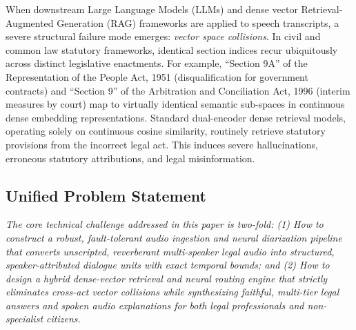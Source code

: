 \documentclass{llncs}
\begin{document}
When downstream Large Language Models (LLMs) and dense vector Retrieval-Augmented Generation (RAG) frameworks are applied to speech transcripts, a severe structural failure mode emerges: \textit{vector space collisions}. In civil and common law statutory frameworks, identical section indices recur ubiquitously across distinct legislative enactments. For example, ``Section 9A'' of the Representation of the People Act, 1951 (disqualification for government contracts) and ``Section 9'' of the Arbitration and Conciliation Act, 1996 (interim measures by court) map to virtually identical semantic sub-spaces in continuous dense embedding representations. Standard dual-encoder dense retrieval models, operating solely on continuous cosine similarity, routinely retrieve statutory provisions from the incorrect legal act. This induces severe hallucinations, erroneous statutory attributions, and legal misinformation.

\subsection{Unified Problem Statement}
\textit{The core technical challenge addressed in this paper is two-fold: (1) How to construct a robust, fault-tolerant audio ingestion and neural diarization pipeline that converts unscripted, reverberant multi-speaker legal audio into structured, speaker-attributed dialogue units with exact temporal bounds; and (2) How to design a hybrid dense-vector retrieval and neural routing engine that strictly eliminates cross-act vector collisions while synthesizing faithful, multi-tier legal answers and spoken audio explanations for both legal professionals and non-specialist citizens.}
\end{document}
